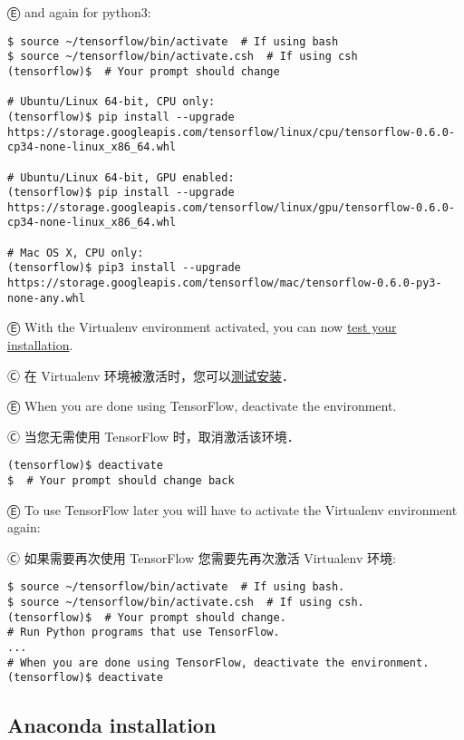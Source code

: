 Ⓔ and again for python3:

\begin{lstlisting}
$ source ~/tensorflow/bin/activate  # If using bash
$ source ~/tensorflow/bin/activate.csh  # If using csh
(tensorflow)$  # Your prompt should change

# Ubuntu/Linux 64-bit, CPU only:
(tensorflow)$ pip install --upgrade https://storage.googleapis.com/tensorflow/linux/cpu/tensorflow-0.6.0-cp34-none-linux_x86_64.whl

# Ubuntu/Linux 64-bit, GPU enabled:
(tensorflow)$ pip install --upgrade https://storage.googleapis.com/tensorflow/linux/gpu/tensorflow-0.6.0-cp34-none-linux_x86_64.whl

# Mac OS X, CPU only:
(tensorflow)$ pip3 install --upgrade https://storage.googleapis.com/tensorflow/mac/tensorflow-0.6.0-py3-none-any.whl
\end{lstlisting}

Ⓔ \textcolor{etc}{With the Virtualenv environment activated, you can now \hyperref[test_install]{test your installation}.}

Ⓒ 在 Virtualenv 环境被激活时，您可以\hyperref[test_install]{测试安装}．

Ⓔ \textcolor{etc}{When you are done using TensorFlow, deactivate the environment.}

Ⓒ 当您无需使用 TensorFlow 时，取消激活该环境．

\begin{lstlisting}
(tensorflow)$ deactivate
$  # Your prompt should change back
\end{lstlisting}

Ⓔ \textcolor{etc}{To use TensorFlow later you will have to activate the Virtualenv environment again:}

Ⓒ 如果需要再次使用 TensorFlow 您需要先再次激活 Virtualenv 环境:

\begin{lstlisting}
$ source ~/tensorflow/bin/activate  # If using bash.
$ source ~/tensorflow/bin/activate.csh  # If using csh.
(tensorflow)$  # Your prompt should change.
# Run Python programs that use TensorFlow.
...
# When you are done using TensorFlow, deactivate the environment.
(tensorflow)$ deactivate
\end{lstlisting}



\subsection {Anaconda installation}

